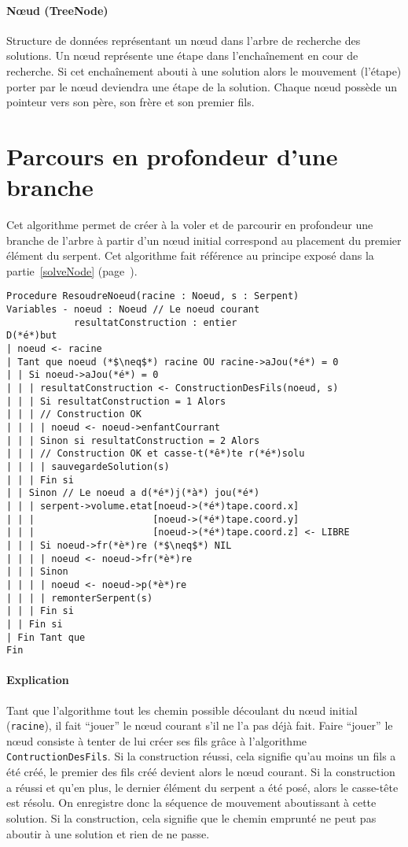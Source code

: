 \paragraph{Nœud (TreeNode)} Structure de données représentant un nœud dans l'arbre de recherche des solutions. Un nœud représente une étape dans l'enchaînement en cour de recherche. Si cet enchaînement abouti à une solution alors le mouvement (l'étape) porter par le nœud deviendra une étape de la solution.
Chaque nœud possède un pointeur vers son père, son frère et son premier fils.

\section{Parcours en profondeur d'une branche}
Cet algorithme permet de créer à la voler et de parcourir en profondeur une branche de l'arbre à partir d'un nœud initial correspond au placement du premier élément du serpent. Cet algorithme fait référence au principe exposé dans la partie~\ref{solveNode} (page~\pageref{solveNode}).

\begin{lstlisting}[caption=Algorithme de résolution pour une branche]
Procedure ResoudreNoeud(racine : Noeud, s : Serpent)
Variables - noeud : Noeud // Le noeud courant
            resultatConstruction : entier
D(*é*)but
| noeud <- racine
| Tant que noeud (*$\neq$*) racine OU racine->aJou(*é*) = 0
| | Si noeud->aJou(*é*) = 0
| | | resultatConstruction <- ConstructionDesFils(noeud, s)
| | | Si resultatConstruction = 1 Alors
| | | // Construction OK
| | | | noeud <- noeud->enfantCourrant
| | | Sinon si resultatConstruction = 2 Alors
| | | // Construction OK et casse-t(*ê*)te r(*é*)solu 
| | | | sauvegardeSolution(s)
| | | Fin si
| | Sinon // Le noeud a d(*é*)j(*à*) jou(*é*)
| | | serpent->volume.etat[noeud->(*é*)tape.coord.x]
| | |                     [noeud->(*é*)tape.coord.y]
| | |                     [noeud->(*é*)tape.coord.z] <- LIBRE
| | | Si noeud->fr(*è*)re (*$\neq$*) NIL
| | | | noeud <- noeud->fr(*è*)re
| | | Sinon
| | | | noeud <- noeud->p(*è*)re
| | | | remonterSerpent(s)
| | | Fin si
| | Fin si
| Fin Tant que
Fin
\end{lstlisting}

\newpage
\paragraph{Explication}
Tant que l'algorithme tout les chemin possible découlant du nœud initial (\verb|racine|), il fait ``jouer'' le nœud courant s'il ne l'a pas déjà fait. Faire ``jouer'' le nœud consiste à tenter de lui créer ses fils grâce à l'algorithme \verb|ContructionDesFils|. Si la construction réussi, cela signifie qu'au moins un fils a été créé, le premier des fils créé devient alors le nœud courant. Si la construction a réussi et qu'en plus, le dernier élément du serpent a été posé, alors le casse-tête est résolu. On enregistre donc la séquence de mouvement aboutissant à cette solution. Si la construction, cela signifie que le chemin emprunté ne peut pas aboutir à une solution et rien de ne passe.

